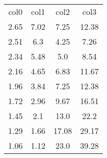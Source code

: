 \begin{table}
\begin{tabular}{cccc}
col0 & col1 & col2 & col3 \\
2.65 & 7.02 & 7.25 & 12.38 \\
2.51 & 6.3 & 4.25 & 7.26 \\
2.34 & 5.48 & 5.0 & 8.54 \\
2.16 & 4.65 & 6.83 & 11.67 \\
1.96 & 3.84 & 7.25 & 12.38 \\
1.72 & 2.96 & 9.67 & 16.51 \\
1.45 & 2.1 & 13.0 & 22.2 \\
1.29 & 1.66 & 17.08 & 29.17 \\
1.06 & 1.12 & 23.0 & 39.28 \\
\end{tabular}
\end{table}
